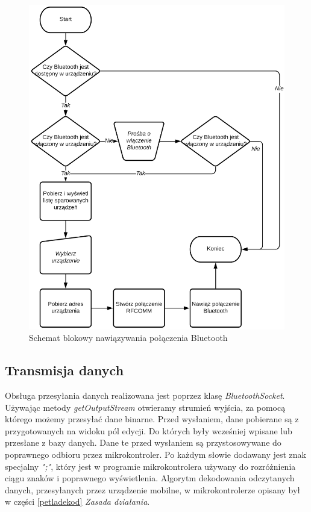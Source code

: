 \documentclass[a4paper,12pt, twoside]{article}
\begin{document}
    	\begin{figure}[H]
    	        \centering
    	        \vspace{.5cm}
    			\includegraphics[width=12cm]{images/rys_12bluetoothconnection.png}
    			\vspace{.5cm}
    			\caption{Schemat blokowy nawiązywania połączenia Bluetooth}
                \label{fig:btconnect}
    	\end{figure}
    	
    	\vspace{.5cm}
    	\subsection{Transmisja danych}
    	Obsługa przesyłania danych realizowana jest poprzez klasę \textit{BluetoothSocket}. Używając metody \textit{getOutputStream}\cite{outputstream} otwieramy strumień wyjścia, za pomocą którego możemy przesyłać dane binarne. Przed wysłaniem, dane pobierane są z przygotowanych na widoku pól edycji. Do których były wcześniej wpisane lub przesłane z bazy danych. Dane te przed wysłaniem są przystosowywane do poprawnego odbioru przez mikrokontroler. Po każdym słowie dodawany jest znak specjalny \textit{";"}, który jest w programie mikrokontrolera używany do rozróżnienia ciągu znaków i poprawnego wyświetlenia. Algorytm dekodowania odczytanych danych, przesyłanych przez urządzenie mobilne, w mikrokontrolerze opisany był w części \ref{petladekod} \textit{Zasada działania}.
    	
\end{document}

